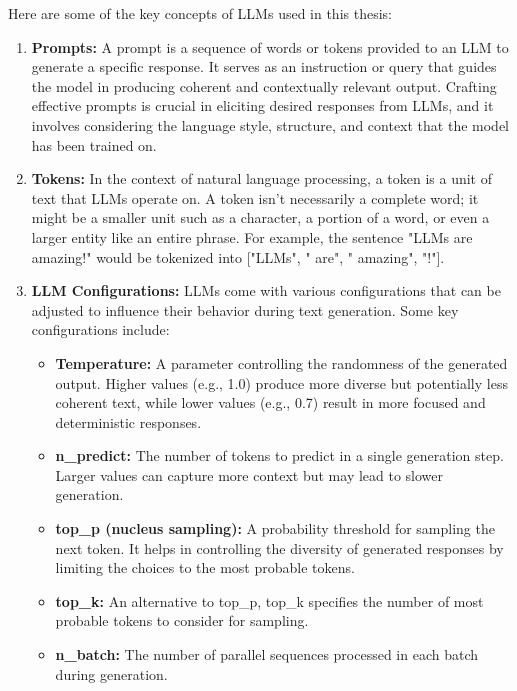 Here are some of the key concepts of LLMs used in this thesis:
\begin{enumerate}
    \item \textbf{Prompts:} A prompt is a sequence of words or tokens provided to an LLM to generate a specific response. It serves as an instruction or query that guides the model in producing coherent and contextually relevant output. Crafting effective prompts is crucial in eliciting desired responses from LLMs, and it involves considering the language style, structure, and context that the model has been trained on.

    \item \textbf{Tokens:} In the context of natural language processing, a token is a unit of text that LLMs operate on. A token isn't necessarily a complete word; it might be a smaller unit such as a character, a portion of a word, or even a larger entity like an entire phrase. For example, the sentence "LLMs are amazing!" would be tokenized into ["LLMs", " are", " amazing", "!"].

    \item \textbf{LLM Configurations:} LLMs come with various configurations that can be adjusted to influence their behavior during text generation. Some key configurations include:

        \begin{itemize}
            \item \textbf{Temperature:} A parameter controlling the randomness of the generated output. Higher values (e.g., 1.0) produce more diverse but potentially less coherent text, while lower values (e.g., 0.7) result in more focused and deterministic responses.

            \item \textbf{n\_predict:} The number of tokens to predict in a single generation step. Larger values can capture more context but may lead to slower generation.

            \item \textbf{top\_p (nucleus sampling):} A probability threshold for sampling the next token. It helps in controlling the diversity of generated responses by limiting the choices to the most probable tokens.

            \item \textbf{top\_k:} An alternative to top\_p, top\_k specifies the number of most probable tokens to consider for sampling.

            \item \textbf{n\_batch:} The number of parallel sequences processed in each batch during generation.
            

\end{itemize}
\end{enumerate}
